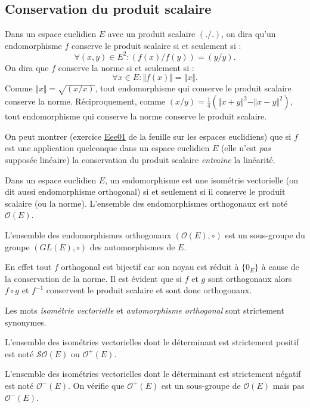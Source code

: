 \subsection{Conservation du produit scalaire}
Dans un espace euclidien $E$ avec un produit scalaire $(./.)$, on dira qu'un endomorphisme $f$ conserve le produit scalaire si et seulement si :
\begin{displaymath}
 \forall(x,y)\in E^2 : (f(x)/f(y)) = (y/y).
\end{displaymath}
On dira que $f$ conserve la norme si et seulement si :
\begin{displaymath}
 \forall x\in E : \Vert f(x)\Vert = \Vert x \Vert.
\end{displaymath}
Comme $\Vert x \Vert = \sqrt{(x/x)}$, tout endomorphisme qui conserve le produit scalaire conserve la norme. Réciproquement, comme $(x/y)=\frac{1}{4}\left(\Vert x+y\Vert^2  - \Vert x-y\Vert^2\right)$, tout endomorphisme qui conserve la norme conserve le produit scalaire.
\begin{rem}
  On peut montrer (exercice \hyperref{\urlexo _fex_ee.pdf}{exo}{Eee01}{Eee01} de la feuille sur les espaces euclidiens) que si $f$ est une application quelconque dans un espace euclidien $E$ (elle n'est \emph{pas} supposée linéaire) la conservation du produit scalaire \emph{entraine} la linéarité.
\end{rem}
\begin{defi}
 Dans un espace euclidien $E$, un endomorphisme est une isométrie vectorielle (on dit aussi endomorphisme orthogonal) si et seulement si il conserve le produit scalaire (ou la norme). L'ensemble des endomorphismes orthogonaux est noté $\mathcal O(E)$.
\end{defi}

 
\begin{prop}
 L'ensemble des endomorphismes orthogonaux $(\mathcal O(E),\circ)$ est un sous-groupe du groupe $(GL(E),\circ)$ des automorphismes de $E$.
\end{prop}
\begin{demo}
 En effet tout $f$ orthogonal est bijectif car son noyau est réduit à $\{0_E\}$ à cause de la conservation de la norme. Il est évident que si $f$ et $g$ sont orthogonaux alors $f\circ g$ et $f^{-1}$ conservent le produit scalaire et sont donc orthogonaux.
\end{demo}
\begin{rem}
  Les mots \emph{isométrie vectorielle} et \emph{automorphisme orthogonal} sont strictement synonymes.
\end{rem}
\begin{defi}
  L'ensemble des isométries vectorielles dont le déterminant est strictement positif est noté $\mathcal{SO}(E)$ ou $\mathcal{O}^+(E)$.
\end{defi}
\begin{rem}
  L'ensemble des isométries vectorielles dont le déterminant est strictement négatif est noté $\mathcal{O}^-(E)$. On vérifie que $\mathcal{O}^+(E)$ est un sous-groupe de $\mathcal{O}(E)$ mais pas $\mathcal{O}^-(E)$.
\end{rem}

